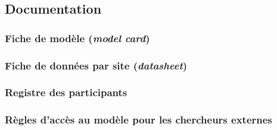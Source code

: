 \subsection{Documentation}
\label{sec:documentation}

\subsubsection{Fiche de modèle (\emph{model card})}
\label{sec:model-card}

\subsubsection{Fiche de données par site (\emph{datasheet})}
\label{sec:datasheet}

\subsubsection{Registre des participants}
\label{sec:registre}

\subsubsection{Règles d'accès au modèle pour les chercheurs externes}
\label{sec:acces-externe}
